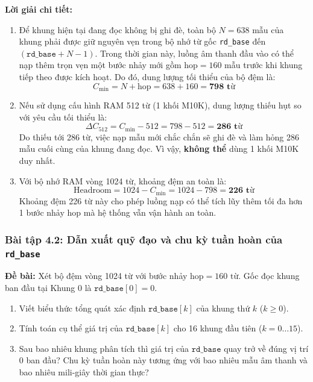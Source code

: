 \textbf{Lời giải chi tiết:}
\begin{enumerate}[label=(\alph*)]
    \item Để khung hiện tại đang đọc không bị ghi đè, toàn bộ $N = 638$ mẫu của khung phải được giữ nguyên vẹn trong bộ nhớ từ gốc \texttt{rd\_base} đến $(\texttt{rd\_base} + N - 1)$. Trong thời gian này, luồng âm thanh đầu vào có thể nạp thêm trọn vẹn một bước nhảy mới gồm $\text{hop} = 160$ mẫu trước khi khung tiếp theo được kích hoạt. Do đó, dung lượng tối thiểu của bộ đệm là:
    \begin{equation}
    C_{\min} = N + \text{hop} = 638 + 160 = \mathbf{798\text{ từ}}
    \end{equation}
    
    \item Nếu sử dụng cấu hình RAM 512 từ (1 khối M10K), dung lượng thiếu hụt so với yêu cầu tối thiểu là:
    \begin{equation}
    \Delta C_{512} = C_{\min} - 512 = 798 - 512 = \mathbf{286\text{ từ}}
    \end{equation}
    Do thiếu tới 286 từ, việc nạp mẫu mới chắc chắn sẽ ghi đè và làm hỏng 286 mẫu cuối cùng của khung đang đọc. Vì vậy, \textbf{không thể} dùng 1 khối M10K duy nhất.
    
    \item Với bộ nhớ RAM vòng 1024 từ, khoảng đệm an toàn là:
    \begin{equation}
    \text{Headroom} = 1024 - C_{\min} = 1024 - 798 = \mathbf{226\text{ từ}}
    \end{equation}
    Khoảng đệm 226 từ này cho phép luồng nạp có thể tích lũy thêm tối đa hơn 1 bước nhảy hop mà hệ thống vẫn vận hành an toàn.
\end{enumerate}

\subsubsection*{Bài tập 4.2: Dẫn xuất quỹ đạo và chu kỳ tuần hoàn của \texttt{rd\_base}}
\textbf{Đề bài:} Xét bộ đệm vòng 1024 từ với bước nhảy $\text{hop} = 160\text{ từ}$. Gốc đọc khung ban đầu tại Khung 0 là $\texttt{rd\_base}[0] = 0$.
\begin{enumerate}[label=(\alph*)]
    \item Viết biểu thức tổng quát xác định $\texttt{rd\_base}[k]$ của khung thứ $k$ ($k \ge 0$).
    \item Tính toán cụ thể giá trị của $\texttt{rd\_base}[k]$ cho 16 khung đầu tiên ($k = 0 \dots 15$).
    \item Sau bao nhiêu khung phân tích thì giá trị của $\texttt{rd\_base}$ quay trở về đúng vị trí 0 ban đầu? Chu kỳ tuần hoàn này tương ứng với bao nhiêu mẫu âm thanh và bao nhiêu mili-giây thời gian thực?
\end{enumerate}

